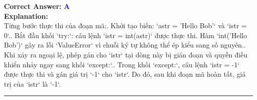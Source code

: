 \documentclass[11pt,a4paper]{article}
\begin{document}
\begin{minipage}{\textwidth}
\noindent \textbf{Correct Answer:} \textcolor{blue}{\textbf{A}} \\[4pt]
\noindent \textbf{Explanation:}\\
Từng bước thực thi của đoạn mã:. Khởi tạo biến: `astr = 'Hello Bob'` và `istr = 0`.. Bắt đầu khối `try:`: câu lệnh `istr = int(astr)` được thực thi. Hàm `int('Hello Bob')` gây ra lỗi `ValueError` vì chuỗi ký tự không thể ép kiểu sang số nguyên.. Khi xảy ra ngoại lệ, phép gán cho `istr` tại dòng này bị gián đoạn và quyền điều khiển nhảy ngay sang khối `except:`.. Trong khối `except:`, câu lệnh `istr = -1` được thực thi và gán giá trị `-1` cho `istr`.\newline
Do đó, sau khi đoạn mã hoàn tất, giá trị của `istr` là `-1`.
\end{minipage}
\vspace{0.8cm}
\hrule
\vspace{0.5cm}
\end{document}
